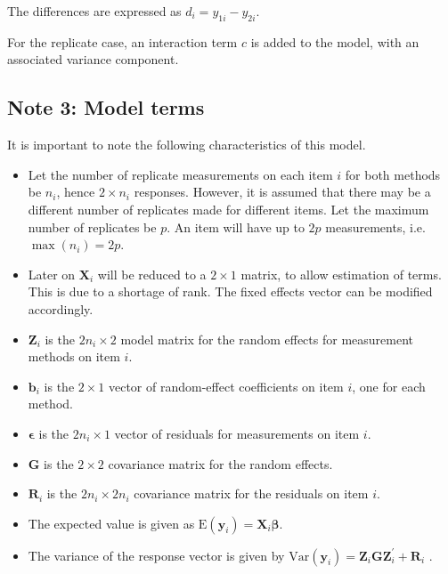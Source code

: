 \documentclass[12pt, a4paper]{article}
\theoremstyle{plain}
\theoremstyle{definition}
\theoremstyle{remark}
\begin{document}
The differences are expressed as $d_{i} = y_{1i} - y_{2i}$.

For the replicate case, an interaction term $c$ is added to the model, with an associated variance component.




\subsection{Note 3: Model terms}
It is important to note the following characteristics of this model.
\begin{itemize}
\item Let the number of replicate measurements on each item $i$ for both methods be $n_i$, hence $2 \times n_i$ responses. However, it is assumed that there may be a different number of replicates made for different items. Let the maximum number of replicates be $p$. An item will have up to $2p$ measurements, i.e. $\max(n_{i}) = 2p$.


\item Later on $\boldsymbol{X}_i$ will be reduced to a $2 \times 1$ matrix, to allow estimation of terms. This is due to a shortage of rank. The fixed effects vector can be modified accordingly.
\item $\boldsymbol{Z}_i$ is the $2n_i \times  2$ model matrix for the random effects for measurement methods on item $i$.
\item $\boldsymbol{b}_i$ is the $2 \times  1$ vector of random-effect coefficients on item $i$, one for each method.
\item $\boldsymbol{\epsilon}$  is the $2n_i \times  1$ vector of residuals for measurements on item $i$.
\item $\boldsymbol{G}$ is the $2 \times  2$ covariance matrix for the random effects.
\item $\boldsymbol{R}_i$ is the $2n_i \times  2n_i$ covariance matrix for the residuals on item $i$.
\item The expected value is given as $\mbox{E}(\boldsymbol{y}_i) = \boldsymbol{X}_i\boldsymbol{\beta}.$ \citep{hamlett}
\item The variance of the response vector is given by $\mbox{Var}(\boldsymbol{y}_i)  = \boldsymbol{Z}_i \boldsymbol{G} \boldsymbol{Z}_i^{\prime} + \boldsymbol{R}_i$ \citep{hamlett}.
\end{itemize}
\newpage
\end{document}
